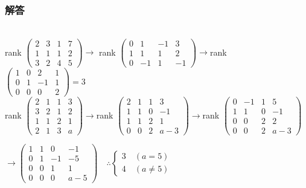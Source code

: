 \subsubsection{解答}
\noindent
{}\\
rank
$\begin{pmatrix}
    2 & 3 & 1 & 7 \\
    1 & 1 & 1 & 2 \\
    3 & 2 & 4 & 5
\end{pmatrix}\rightarrow$
rank
$\begin{pmatrix}
    0 & 1 & -1 & 3 \\
    1 & 1 & 1 & 2 \\
    0 & -1 & 1 & -1
\end{pmatrix}\rightarrow$rank
$\begin{pmatrix}
    1 & 0 & 2 & 1 \\
    0 & 1 & -1 & 1 \\
    0 & 0 & 0 & 2
\end{pmatrix}=3$\\
rank
$\begin{pmatrix}
    2 & 1 & 1 & 3 \\
    3 & 2 & 1 & 2 \\
    1 & 1 & 2 & 1 \\
    2 & 1 & 3 & a
\end{pmatrix}\rightarrow$rank
$\begin{pmatrix}
    2 & 1 & 1 & 3 \\
    1 & 1 & 0 & -1 \\
    1 & 1 & 2 & 1 \\
    0 & 0 & 2 & a-3
\end{pmatrix}\rightarrow$rank
$\begin{pmatrix}
    0 & -1 & 1 & 5 \\
    1 & 1 & 0 & -1 \\
    0 & 0 & 2 & 2 \\
    0 & 0 & 2 & a-3
\end{pmatrix}$\\ 
\begin{flushright}
$\rightarrow \begin{pmatrix}
    1 & 1 & 0 & -1 \\
    0 & 1 & -1 & -5 \\
    0 & 0 & 1 & 1 \\
    0 & 0 & 0 & a-5
\end{pmatrix}
\quad \therefore
\begin{cases*}
    3 \quad (a=5) \\
    4 \quad (a \neq 5)
\end{cases*}$
\end{flushright}
